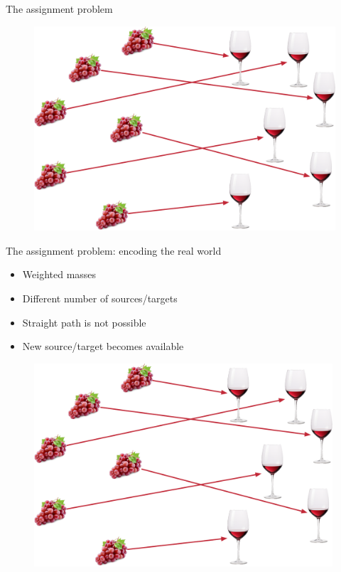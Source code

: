 \documentclass[pdf,aspectratio=169,10pt]{beamer}
\begin{document}
\begin{frame}{The assignment problem}
    \begin{figure}
        \includegraphics[height=0.7\textheight]{../img/wine_assignment.pdf}  
    \end{figure}
\end{frame}

\begin{frame}{The assignment problem: encoding the real world}

\begin{minipage}{0.45\textwidth}
\begin{itemize}
    \item Weighted masses
    \item Different number of sources/targets
    \item Straight path is not possible
    \item New source/target becomes available
\end{itemize}
\vspace{2em}
\centerline{  }
\end{minipage}
\hfill
\begin{minipage}{0.5\textwidth}
 \begin{figure}
        \includegraphics[width=0.99\textwidth]{../img/wine_assignment.pdf}  
    \end{figure}
\end{minipage}

\end{frame}
\end{document}
